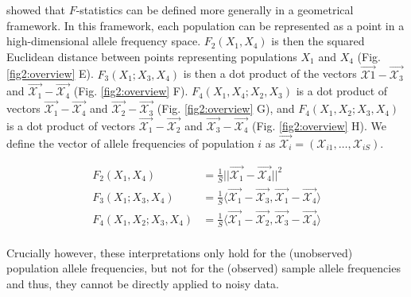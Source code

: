 \documentclass[12pt]{article}
\newcommand{\CX}{\mathcal{X}}
\begin{document}
\cite{oteo-garcia_geometrical_2021} showed that $F$-statistics can be defined more generally in a geometrical framework. In this framework, each population can be represented as a point in a high-dimensional allele frequency space. $F_2(X_1, X_4)$ is then the  squared Euclidean distance between points representing populations $X_1$ and $X_4$ (Fig. \ref{fig2:overview} E). $F_3(X_1;X_3,X_4)$ is then a dot product of the vectors $\Vec{\CX1} - \Vec{\CX_3}$ and $\Vec{\CX_1} - \Vec{\CX_4}$ (Fig. \ref{fig2:overview} F). $F_4(X_1,X_4;X_2,X_3)$ is a dot product of vectors $\Vec{\CX_1} - \Vec{\CX_4}$ and $\Vec{\CX_2} - \Vec{\CX_3}$ (Fig. \ref{fig2:overview} G), and $F_4(X_1,X_2;X_3,X_4)$ is a dot product of vectors $\Vec{\CX_1} - \Vec{\CX_2}$ and $\Vec{\CX_3} - \Vec{\CX_4}$ (Fig. \ref{fig2:overview} H). We define the vector of allele frequencies of population $i$ as $\Vec{\CX_i} = (\mathcal{X}_{i1}, \dots, \mathcal{X}_{iS})$. 

\begin{align}\label{eq:f_geometric}
F_2(X_1,X_4) &= \frac{1}{S}||\Vec{\mathcal{X}_{1}} - \vec{\mathcal{X}_{4}}||^2\nonumber\\
F_3(X_1;X_3,X_4) &= \frac{1}{S} \langle\vec{\mathcal{X}_{1}} - \vec{\mathcal{X}_{3}},\vec{\mathcal{X}_{1}} - \vec{\mathcal{X}_{4}}\rangle\nonumber\\
F_4(X_1,X_2;X_3,X_4) &= \frac{1}{S}\langle\vec{\mathcal{X}_{1}} - \vec{\mathcal{X}_{2}},\vec{\mathcal{X}_{3}} - \vec{\mathcal{X}_{4}}\rangle\nonumber\\
\end{align}

Crucially however, these interpretations only hold for the (unobserved) population allele frequencies, but not for the (observed) sample allele frequencies and thus, they cannot be directly applied to noisy data.
\end{document}
